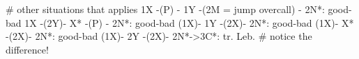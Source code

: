 # other situations that applies
 1X -(P) - 1Y -(2M = jump overcall) - 2N*: good-bad
 1X -(2Y)- X* -(P) - 2N*: good-bad
(1X)- 1Y -(2X)- 2N*: good-bad
(1X)- X* -(2X)- 2N*: good-bad
(1X)- 2Y -(2X)- 2N*->3C*: tr. Leb.  # notice the difference!